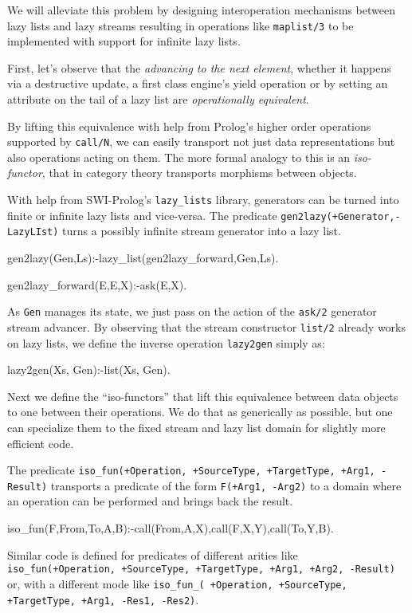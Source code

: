 \documentclass{new_tlp}
\begin{document}
We will alleviate this problem by designing interoperation mechanisms between lazy lists and lazy streams resulting in operations like {\tt maplist/3} to be implemented with support for infinite lazy lists.

First, let's observe that the {\em advancing to the next element}, 
whether it happens via a destructive update,
a first class engine's yield operation or by setting an attribute on the tail of
a lazy list are {\em operationally equivalent}.

By lifting this equivalence with help from Prolog's higher order operations
supported by {\tt call/N}, we can easily transport not just  data representations 
but also   operations acting on them.
The more formal analogy to this is an {\em iso-functor}, that in category theory
transports morphisms between objects. 

With help from SWI-Prolog's {\tt lazy\_lists} library, 
generators can be turned into finite or infinite lazy lists and vice-versa.
The predicate {\tt gen2lazy(+Generator,-LazyLIst)} turns a possibly infinite
stream generator into a lazy list.
\begin{code} 
gen2lazy(Gen,Ls):-lazy_list(gen2lazy_forward,Gen,Ls).

gen2lazy_forward(E,E,X):-ask(E,X).
\end{code}
As {\tt Gen}  manages its state, we just pass on the action of the {\tt ask/2}
generator stream advancer.
By observing that the stream constructor {\tt list/2} already works
on lazy lists, we define the inverse operation {\tt lazy2gen} simply as:
\begin{code}
lazy2gen(Xs, Gen):-list(Xs, Gen).
\end{code}

Next we define the ``iso-functors'' that 
lift this equivalence between data objects to 
one between their operations. We do that as generically as possible,
but one can specialize them to the fixed stream and lazy list domain
for slightly more efficient code.

The predicate 
{\tt iso\_fun(+Operation, +SourceType, +TargetType, +Arg1, -Result)}
transports a predicate of the form {\tt F(+Arg1, -Arg2)} to a domain where
an operation can be performed and brings back the result.

\begin{code}
iso_fun(F,From,To,A,B):-call(From,A,X),call(F,X,Y),call(To,Y,B).
\end{code}


Similar code is defined for predicates of different arities  like 
{\tt iso\_fun(+Operation, +SourceType, +TargetType, +Arg1, +Arg2, -Result)} 
or, with a different mode like
{\tt iso\_fun\_( +Operation, +SourceType, +TargetType, +Arg1, -Res1, -Res2)}.
\end{document}
